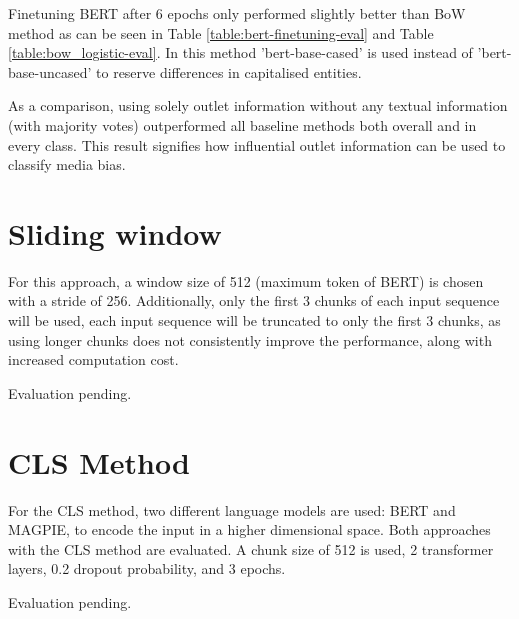 Finetuning BERT after 6 epochs only performed slightly better than BoW method as can be seen in Table \ref{table:bert-finetuning-eval} and Table \ref{table:bow_logistic-eval}. In this method 'bert-base-cased' is used instead of 'bert-base-uncased' to reserve differences in capitalised entities.

As a comparison, using solely outlet information without any textual information (with majority votes) outperformed all baseline methods both overall and in every class. This result signifies how influential outlet information can be used to classify media bias.

\begin{comment}
Find out why TF-IDF performs worse on class problematic
\end{comment}


\section{Sliding window}

For this approach, a window size of 512 (maximum token of BERT) is chosen with a stride of 256. Additionally, only the first 3 chunks of each input sequence will be used, each input sequence will be truncated to only the first 3 chunks, as using longer chunks does not consistently improve the performance, along with increased computation cost.

Evaluation pending.

\section{CLS Method}

For the CLS method, two different language models are used: BERT and MAGPIE, to encode the input in a higher dimensional space. Both approaches with the CLS method are evaluated. A chunk size of 512 is used, 2 transformer layers, 0.2 dropout probability, and 3 epochs.

Evaluation pending.


